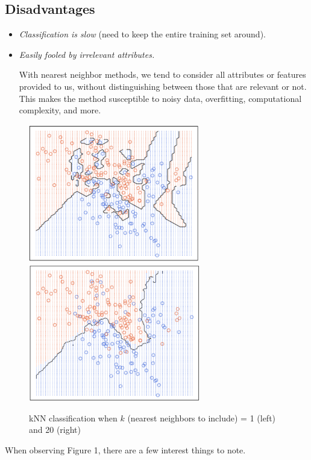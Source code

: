 \documentclass{report}
\begin{document}
\subsection{Disadvantages}
  \begin{itemize}
    \item \emph{Classification is slow} (need to keep the entire training set around).
    \item \emph{Easily fooled by irrelevant attributes.}
    
    With nearest neighbor methods, we tend to consider all attributes or
    features provided to us, without distinguishing between those that are
    relevant or not. This makes the method susceptible to noisy data,
    overfitting, computational complexity, and more.
  \end{itemize}
  \begin{figure}[h!]
    \centering
    \includegraphics[width=7.5cm]{1nn.png}
    \includegraphics[width=7.5cm]{20nn.png}
    \caption{kNN classification when \(k\) (nearest neighbors to include) = 1 (left) and 20 (right)}
  \end{figure}
  When observing Figure 1, there are a few interest things to note. 
\end{document}
